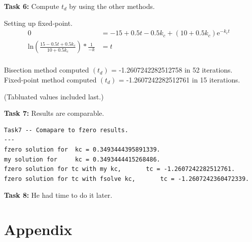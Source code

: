 \documentclass{article}
\begin{document}
  \noindent
  \textbf{Task 6:}
  Compute $t_d$ by using the other methods.

  \noindent
  Setting up fixed-point.
  \begin{align*}
    0 &= -15 + 0.5t - 0.5k_c + (10 + 0.5k_c)\mathrm{e}^{-k_ct} \\
    \mathrm{ln}(\frac{15 - 0.5t + 0.5k_c}{10 + 0.5k_c}) * \frac{1}{-k} &= t \\
  \end{align*}

  \noindent
  Bisection method computed $(t_d)$ = -1.2607242282512758 in 52 iterations. \\
  Fixed-point method computed $(t_d)$ = -1.2607242282512761 in 15 iterations.

  \noindent
  (Tabluated values included last.)


\noindent
\textbf{Task 7:}
Results are comparable.
\begin{verbatim}
Task7 -- Comapare to fzero results.
---
fzero solution for 	kc = 0.3493444395891339.
my solution for 	kc = 0.3493444415268486.
fzero solution for tc with my kc, 		tc = -1.2607242282512761.
fzero solution for tc with fsolve kc, 		tc = -1.2607242360472339.
\end{verbatim}

\noindent
\textbf{Task 8:}
He had time to do it later.

\section{Appendix}
\end{document}
